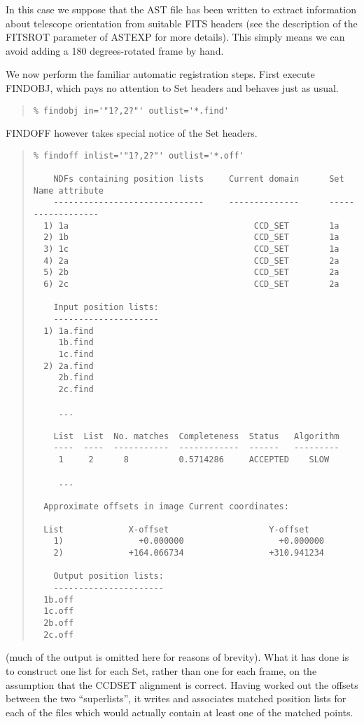 \documentclass[twoside,11pt]{article}
\newcommand{\htmlref}[2]{#1}
\renewcommand{\_}{\texttt{\symbol{95}}}
\newenvironment{myquote}{\begin{quote}\begin{small}}{\end{small}\end{quote}}
\newcommand{\xroutine}[1]{\htmlref{{\sc #1}}{#1}}
\begin{document}
In this case we suppose that the AST file has been written to extract 
information about telescope orientation from suitable FITS headers 
(see the description of the FITSROT parameter of \xroutine{ASTEXP}
for more details).  This simply means we can avoid adding a
180 degrees-rotated frame by hand.

We now perform the familiar automatic registration steps.
First execute \xroutine{FINDOBJ}, which pays no attention to Set headers
and behaves just as usual.
\begin{myquote}
\begin{verbatim}
% findobj in='"1?,2?"' outlist='*.find'
\end{verbatim}
\end{myquote}
\xroutine{FINDOFF} however takes special notice of the Set headers.
\begin{myquote}
\begin{verbatim}
% findoff inlist='"1?,2?"' outlist='*.off'

    NDFs containing position lists     Current domain      Set Name attribute
    ------------------------------     --------------      ------------------
  1) 1a                                     CCD_SET        1a
  2) 1b                                     CCD_SET        1a
  3) 1c                                     CCD_SET        1a
  4) 2a                                     CCD_SET        2a
  5) 2b                                     CCD_SET        2a
  6) 2c                                     CCD_SET        2a

    Input position lists:
    ---------------------
  1) 1a.find
     1b.find
     1c.find
  2) 2a.find
     2b.find
     2c.find

     ...

    List  List  No. matches  Completeness  Status   Algorithm
    ----  ----  -----------  ------------  ------   ---------
     1     2      8          0.5714286     ACCEPTED    SLOW

     ...

  Approximate offsets in image Current coordinates:

  List             X-offset                    Y-offset
    1)               +0.000000                   +0.000000
    2)             +164.066734                 +310.941234

    Output position lists:
    ----------------------
  1b.off
  1c.off
  2b.off
  2c.off
\end{verbatim}
\end{myquote}
(much of the output is omitted here for reasons of brevity).
What it has done is to construct one list for each Set, rather than
one for each frame, on the assumption that the CCD\_SET 
alignment is correct.
Having worked out the offsets between the two ``superlists'', 
it writes and associates matched position lists for each of the files
which would actually contain at least one of the matched points.
\end{document}
